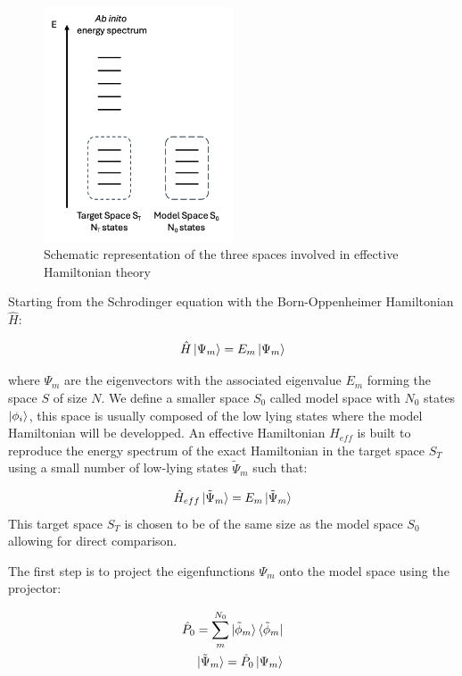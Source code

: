 \documentclass[10pt]{report}
\numberwithin{equation}{section}
\begin{document}
\begin{figure}[h!]
    \centering
    \includegraphics[width=0.5\textwidth]{Images/HEFF.png}
    \caption{Schematic representation of the three spaces involved in effective Hamiltonian theory}
    \label{fig:Heff}
\end{figure}

Starting from the Schrodinger equation with the Born-Oppenheimer Hamiltonian $\hat{H}$:

\begin{equation}
    \hat{H}\ket{\Psi_m}=E_m\ket{\Psi_m}
\end{equation}

where $\Psi_m$ are the eigenvectors with the associated eigenvalue $E_m$ forming the space $S$ of size $N$. 
We define a smaller space $S_0$ called model space with $N_0$ states $\ket{\phi_i}$, this space is usually composed of the low lying states where the model Hamiltonian will be developped.
An effective Hamiltonian $H_{eff}$  is built to reproduce the energy spectrum of the exact Hamiltonian in the target space $S_T$ using a small number of low-lying states $\tilde{\Psi}_m$ such that:

\begin{equation}
    \hat{H}_{eff}\ket{\tilde{\Psi}_m}=E_m \ket{\tilde{\Psi}_m}
\end{equation}
This target space $S_T$ is chosen to be of the same size as the model space $S_0$ allowing for direct comparison.

The first step is to project the eigenfunctions $\Psi_m$ onto the model space using the projector:

\begin{align}
    \hat{P}_0=\sum_{m}^{N_0} \ket{\tilde{\phi}_m} \bra{\tilde{\phi}_m}\\
    \ket{\tilde{\Psi}_m}=\hat{P}_0 \ket{\Psi_m}
\end{align}
\end{document}
